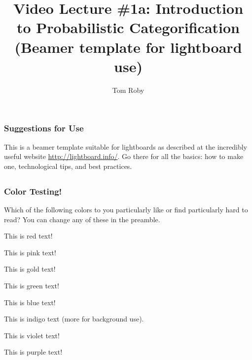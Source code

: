 \documentclass[aspectratio=169,xcolor={table,dvipsnames}]{beamer}
\author{Tom Roby}
\title[VL\#1a: Intro to ProbCat]{Video Lecture \#1a: Introduction to Probabilistic
Categorification (Beamer template for lightboard use)}
\date{}  %
\newcommand{\cred}[1]{{\color{myred}#1}}
\newcommand{\cpink}[1]{{\color{mypink}#1}}
\newcommand{\cblu}[1]{{\color{myblue}#1}}
\newcommand{\cpurp}[1]{{\color{mypurple}#1}}
\newcommand{\cgrn}[1]{{\color{mygreen}#1}}
\newcommand{\cvio}[1]{{\color{myviolet}#1}}
\newcommand{\cgold}[1]{{\color{mygold}#1}}
\newcommand{\cindig}[1]{{\color{myindig}#1}} %
\begin{document}

\begin{frame}

\titlepage
\end{frame}



\begin{frame}
 \section{}
 \frametitle{Suggestions for Use} 

This is a beamer template suitable for lightboards as described at the incredibly useful
website \url{http://lightboard.info/}.  Go there for all the basics: how to make one,
technological tips, and best practices.  




\end{frame}



\begin{frame}
 \section{}
 \frametitle{Color Testing!} 

Which of the following colors to you particularly like or find particularly hard to read?
You can change any of these in the preamble.  

\cred{This is red text!}

\cpink{This is pink text!}

\cgold{This is gold text!}

\cgrn{This is green text!}

\cblu{This is blue text!}

\cindig{This is indigo text (more for background use).}

\cvio{This is violet text!}

\cpurp{This is purple text!}

\end{frame}



\end{document}
